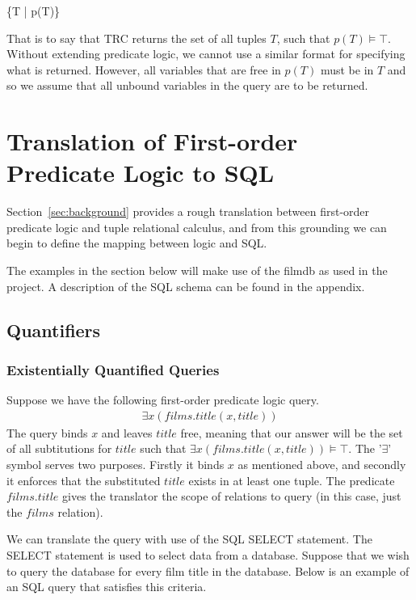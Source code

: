 \documentclass[a4paper, 11pt]{article}
\begin{document}
      \{T | p(T)\}

      That is to say that TRC returns the set of all tuples $T$, such that 
      $p(T) \models \top$. Without extending predicate logic, we cannot use 
      a similar format for specifying what is returned. However, all 
      variables that are free in $p(T)$ must be in $T$ and so we assume 
      that all unbound variables in the query are to be returned.

  \section{Translation of First-order Predicate Logic to SQL}

    Section~\ref{sec:background} provides a rough translation between
    first-order predicate logic and tuple relational calculus, and from this
    grounding we can begin to define the mapping between logic and SQL.

    The examples in the section below will make use of the filmdb as used in
    the project. A description of the SQL schema can be found in the appendix.

    \subsection{Quantifiers}

    \subsubsection{Existentially Quantified Queries}

    Suppose we have the following first-order predicate logic query.
    \begin{gather}
      \exists x(films.title(x, title)) \label{select1}
    \end{gather}
    The query binds $x$ and leaves $title$ free, meaning that our
    answer will be the set of all subtitutions for $title$ such that
    $\exists x(films.title(x, title)) \models \top$. The '$\exists$' symbol
    serves two purposes. Firstly it binds $x$ as mentioned above, and secondly
    it enforces that the substituted $title$ exists in at least one tuple.
    The predicate $films.title$ gives the translator the scope of
    relations to query (in this case, just the $films$ relation).

    We can translate the query with use of the SQL SELECT statement. The SELECT
    statement is used to select data from a database.\cite{w3SELECT} Suppose
    that we wish to query the database for every film title in the database.
    Below is an example of an SQL query that satisfies this criteria.
\end{document}
